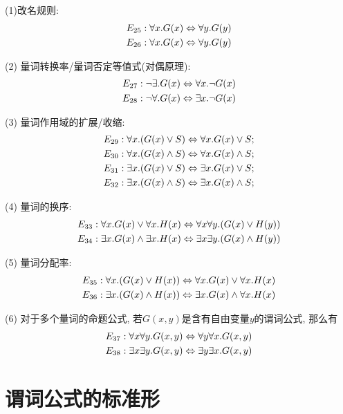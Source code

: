 \begin{theorem}[谓词公式等价的定律]
	(1)改名规则: \begin{align*}E_{25}:\forall x. G(x)\Leftrightarrow \forall y.G(y)\\ E_{26}:\forall x. G(x)\Leftrightarrow \forall y.G(y)\end{align*}
	
	(2) 量词转换率/量词否定等值式(对偶原理): \begin{align*}E_{27}:\lnot \exists. G(x)\Leftrightarrow \forall x. \lnot G(x)\\ E_{28}:\lnot \forall. G(x)\Leftrightarrow \exists x. \lnot G(x)\end{align*}
	
	(3) 量词作用域的扩展/收缩: 
	\begin{align*}
		E_{29}:\forall x.(G(x)\lor S)\Leftrightarrow \forall x. G(x) \lor S;\\
		E_{30}:\forall x.(G(x)\land S)\Leftrightarrow \forall x. G(x) \land S; \\
		E_{31}:\exists x.(G(x)\lor S)\Leftrightarrow \exists x. G(x) \lor S;\\
		E_{32}:\exists x.(G(x)\land S)\Leftrightarrow \exists x. G(x) \land S; 
	\end{align*}
	
	(4) 量词的换序: 
	\begin{align*}
		E_{33}:\forall x.G(x)\lor \forall x. H(x) \Leftrightarrow \forall x \forall y. (G(x)\lor H(y))\\
		E_{34}:\exists x.G(x)\land \exists x. H(x) \Leftrightarrow \exists x \exists y. (G(x)\land H(y))
	\end{align*}
	
	(5) 量词分配率: 
	\begin{align*}
		E_{35}:\forall x.(G(x)\lor H(x))\Leftrightarrow \forall x.G(x)\lor \forall x.H(x)\\
		E_{36}:\exists x.(G(x)\land H(x))\Leftrightarrow \exists x.G(x)\land \forall x.H(x)
	\end{align*}
	
	(6) 对于多个量词的命题公式, 若$G(x,y)$是含有自由变量$y$的谓词公式, 那么有
	\begin{align*}
		E_{37}:\forall x\forall y. G(x,y)\Leftrightarrow \forall y\forall x. G(x,y)\\
		E_{38}:\exists x\exists y. G(x,y)\Leftrightarrow \exists y\exists x. G(x,y)
	\end{align*}
\end{theorem}

\section{谓词公式的标准形}

